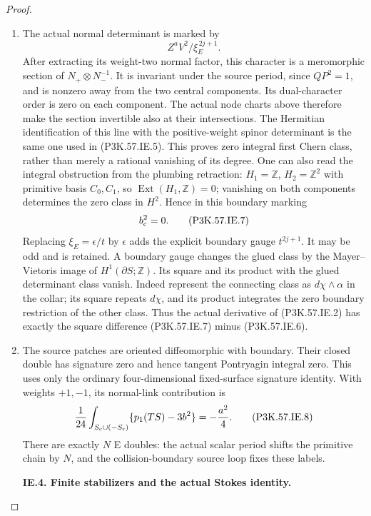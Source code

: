 \begin{proof}
\begin{enumerate}[label=\arabic*.]
\item The actual normal determinant is marked by
\[
                         Z^aV^2/\xi_E^{\,2j+1}.
\]
After extracting its weight-two normal factor,
this character is a meromorphic section of
\(N_+\otimes N_-^{-1}\). It is invariant under the
source period, since \(QP^2=1\), and is nonzero
away from the two central components. Its
dual-character order is zero on each component.
The actual node charts above therefore make the
section invertible also at their intersections.
The Hermitian identification of this line with
the positive-weight spinor determinant is the
same one used in (P3K.57.IE.5). This proves zero
integral first Chern class, rather than merely
a rational vanishing of its degree. One can also
read the integral obstruction from the plumbing
retraction: \(H_1=\mathbb Z\), \(H_2=\mathbb Z^2\)
with primitive basis \(C_0,C_1\), so
\(\operatorname{Ext}(H_1,\mathbb Z)=0\); vanishing
on both components determines the zero class
in \(H^2\). Hence in this boundary marking
\[
                               b_{\rm c}^2=0.           \tag{P3K.57.IE.7}
\]
Replacing \(\xi_E=\epsilon/t\) by \(\epsilon\)
adds the explicit boundary gauge \(t^{2j+1}\).
It may be odd and is retained. A boundary
gauge changes the glued class by the
Mayer--Vietoris image of \(H^1(\partial S;\mathbb Z)\).
Its square and its product with the glued
determinant class vanish. Indeed represent
the connecting class as \(d\chi\wedge\alpha\)
in the collar; its square repeats \(d\chi\),
and its product integrates the zero boundary
restriction of the other class. Thus the
actual derivative of (P3K.57.IE.2) has exactly the
square difference (P3K.57.IE.7) minus (P3K.57.IE.6).

\item The source patches are oriented diffeomorphic
with boundary. Their closed double has
signature zero and hence tangent Pontryagin
integral zero. This uses only the ordinary
four-dimensional fixed-surface signature
identity. With weights \(+1,-1\), its
normal-link contribution is
\[
 \frac1{24}\int_{S_{\rm c}\cup(-S_{\rm r})}
            \{p_1(TS)-3b^2\}=-\frac{a^2}{4}.           \tag{P3K.57.IE.8}
\]
There are exactly \(N\) E doubles: the actual
scalar period shifts the primitive chain by
\(N\), and the collision-boundary source
loop fixes these labels.

\par\medskip\noindent\textbf{IE.4. Finite stabilizers and the actual Stokes identity.}\par\nopagebreak[4]


\end{enumerate}
\end{proof}
